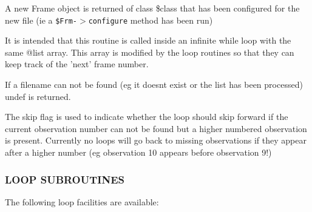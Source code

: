 A new  Frame object is returned of class \$class that has been configured
for the new file (ie a \texttt{\$Frm-$>$configure} method has been run)



It is intended that this routine is called inside an infinite while
loop with the same @list array. This array is modified by the loop
routines so that they can keep track of the 'next' frame number.



If a filename can not be found (eg it doesnt exist or the list has
been processed) undef is returned.



The skip flag is used to indicate whether the loop should skip
forward if the current observation number can not be found
but a higher numbered observation is present. Currently no loops
will go back to missing observations if they appear after a higher
number (eg observation 10 appears before observation 9!)

\subsubsection*{LOOP SUBROUTINES\label{ORAC::Loop_LOOP_SUBROUTINES}}

The following loop facilities are available:

